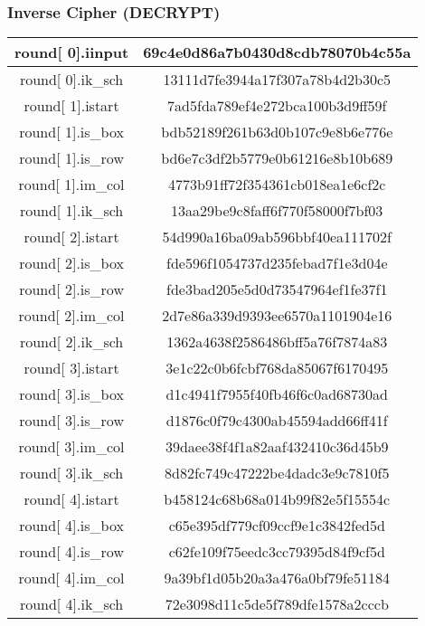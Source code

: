 \subsubsection{Inverse Cipher (DECRYPT)}

\begin{center}

\begin{longtable}{|c|c|}
\hline
round[ 0].iinput&   69c4e0d86a7b0430d8cdb78070b4c55a\\
\hline
round[ 0].ik\_sch&   13111d7fe3944a17f307a78b4d2b30c5\\
\hline
round[ 1].istart&   7ad5fda789ef4e272bca100b3d9ff59f\\
\hline
round[ 1].is\_box&   bdb52189f261b63d0b107c9e8b6e776e\\
\hline
round[ 1].is\_row&   bd6e7c3df2b5779e0b61216e8b10b689\\
\hline
round[ 1].im\_col&   4773b91ff72f354361cb018ea1e6cf2c\\
\hline
round[ 1].ik\_sch&   13aa29be9c8faff6f770f58000f7bf03\\
\hline
round[ 2].istart&   54d990a16ba09ab596bbf40ea111702f\\
\hline
round[ 2].is\_box&   fde596f1054737d235febad7f1e3d04e\\
\hline
round[ 2].is\_row&   fde3bad205e5d0d73547964ef1fe37f1\\
\hline
round[ 2].im\_col&   2d7e86a339d9393ee6570a1101904e16\\
\hline
round[ 2].ik\_sch&   1362a4638f2586486bff5a76f7874a83\\
\hline
round[ 3].istart&   3e1c22c0b6fcbf768da85067f6170495\\
\hline
round[ 3].is\_box&   d1c4941f7955f40fb46f6c0ad68730ad\\
\hline
round[ 3].is\_row&   d1876c0f79c4300ab45594add66ff41f\\
\hline
round[ 3].im\_col&   39daee38f4f1a82aaf432410c36d45b9\\
\hline
round[ 3].ik\_sch&   8d82fc749c47222be4dadc3e9c7810f5\\
\hline
round[ 4].istart&   b458124c68b68a014b99f82e5f15554c\\
\hline
round[ 4].is\_box&   c65e395df779cf09ccf9e1c3842fed5d\\
\hline
round[ 4].is\_row&   c62fe109f75eedc3cc79395d84f9cf5d\\
\hline
round[ 4].im\_col&   9a39bf1d05b20a3a476a0bf79fe51184\\
\hline
round[ 4].ik\_sch&   72e3098d11c5de5f789dfe1578a2cccb\\

\end{longtable}
\end{center}
